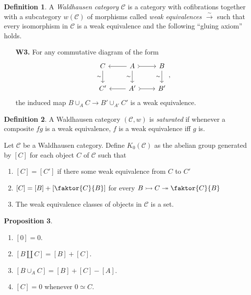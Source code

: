 \documentclass[10pt,letterpaper,cm]{nupset}
\theoremstyle{definition}
\newtheorem{definition}{Definition}[section]
\theoremstyle{theorem}
\newtheorem{prop}[definition]{Proposition}
\theoremstyle{remark}
\newcommand{\1}{\mathbf{1}}
\renewcommand{\c}{\mathscr{C}}
\newcommand{\0}{\vec 0}
\begin{document}
\begin{definition}
A \textit{Waldhausen category} $\c$ is a category with cofibrations together with a subcategory $w(\c)$ of morphisms called \textit{weak equivalences $\overset{\sim}{\longrightarrow}$} such that every isomorphism in $\c$ is a weak equivalence and the following ``gluing axiom'' holds.
\begin{itemize}
\item[\textbf{W3.}] For any commutative diagram of the form
\[
\begin{tikzcd}
C \arrow[d, "\sim"'] & A \arrow[d, "\sim"'] \arrow[r, tail] \arrow[l] & B \arrow[d, "\sim"'] \\
C' & A' \arrow[r, tail] \arrow[l] & B'
\end{tikzcd}, \]
the induced map $B \cup_A C \to  B' \cup_{A'} C'$ is a weak equivalence.
\end{itemize}
\end{definition}

\begin{definition}
A Waldhausen category $\left(\c, w\right)$ is \textit{saturated} if whenever a composite $fg$ is a weak equivalence, $f$ is a weak equivalence iff $g$ is. 
\end{definition}

\smallskip

Let $\c$ be a Waldhausen category. Define $K_0(\c)$ as the abelian group generated by $\left[C\right]$ for each object $C$ of $\c$ such that
\begin{enumerate}
\item $\left[C\right] = \left[C'\right]$ if there some weak equivalence from $C$ to $C'$
\item $\left[C\right] = \left[B\right] + \left[\faktor{C}{B}\right]$ for every $B \rightarrowtail  C \twoheadrightarrow \faktor{C}{B}$
\item The weak equivalence classes of objects in $\c$ is a set.
\end{enumerate}


\begin{prop} $ $
\begin{enumerate}
\item $\left[0\right] = 0$.
\item $\left[B \coprod C\right] = \left[B\right] +\left[C\right]$.
\item $\left[B \cup_A C\right] = \left[B\right]+\left[C\right]-\left[A\right]$.
\item $\left[C\right]= 0$ whenever $0 \simeq C$.
\end{enumerate}
\end{prop}
\end{document}
